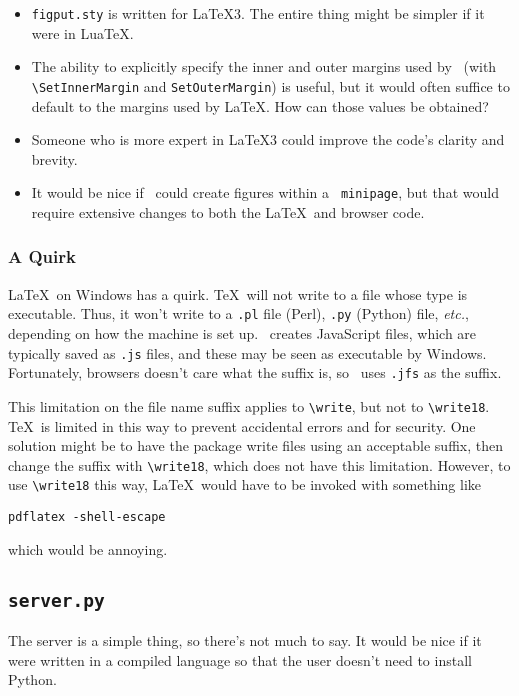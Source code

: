 \documentclass[10pt]{article}
\begin{document}
\begin{itemize}[itemsep=-1pt,leftmargin=*]
\item {\tt figput.sty} is written for \LaTeX3. The entire thing might
  be simpler if it were in Lua\TeX.
\item The ability to explicitly specify the inner and outer margins
  used by \figput\ (with \verb=\SetInnerMargin= and
  \verb=SetOuterMargin=) is useful, but it would often suffice to
  default to the margins used by \LaTeX. How can those values be
  obtained?
\item Someone who is more expert in \LaTeX3 could improve the code's
  clarity and brevity.
\item It would be nice if \figput\ could create figures within a {\tt
  minipage}, but that would require extensive changes to both the
  \LaTeX\ and browser code.
\end{itemize}

\subsubsection*{A Quirk}

\LaTeX\ on Windows has a quirk. \TeX\ will not write to a
file whose type is executable. Thus, it won't write to
a {\tt .pl} file (Perl), {\tt .py} (Python) file, \emph{etc.},
depending on how the machine is set up. \figput\ creates
JavaScript files, which are typically saved as {\tt .js} files, and
these may be seen as executable by Windows. Fortunately,
browsers doesn't care what the suffix is, so \figput\ uses
{\tt .jfs} as the suffix.  
 
This limitation on the file name suffix applies to \verb=\write=, but
not to \verb=\write18=. \TeX\ is limited in this way to prevent
accidental errors and for security. One solution might be to have the
package write files using an acceptable suffix, then change the
suffix with \verb=\write18=, which does not have this
limitation. However, to use \verb=\write18= this way, \LaTeX\ would
have to be invoked with something like
\begin{verbatim}
pdflatex -shell-escape
\end{verbatim}
which would be annoying. 

\subsection{\tt server.py}

The server is a simple thing, so there's not much to say. It
would be nice if it were written in a compiled language so
that the user doesn't need to install Python.
\end{document}
